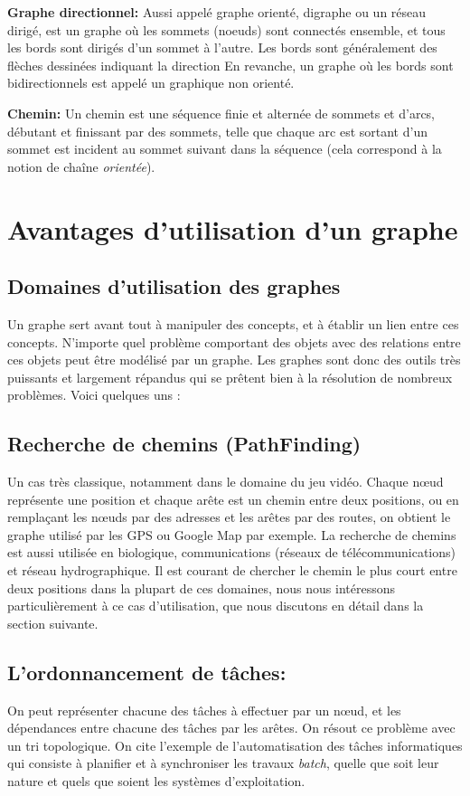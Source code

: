 	\textbf{Graphe directionnel:} Aussi appelé graphe orienté, digraphe ou un réseau dirigé, est un graphe où les sommets (noeuds) sont connectés ensemble, et tous les bords sont dirigés d'un sommet à l'autre. Les bords sont généralement des flèches dessinées indiquant la direction En revanche, un graphe où les bords sont bidirectionnels est appelé un graphique non orienté.

	\textbf{Chemin:} Un chemin est une séquence finie et alternée de sommets et d'arcs, débutant et finissant par des sommets, telle que chaque arc est sortant d'un sommet est incident au sommet suivant dans la séquence (cela correspond à la notion de chaîne \emph{orientée}).

	
	
	\section{Avantages d'utilisation d'un graphe}
	\subsection{Domaines d'utilisation des graphes}
	Un graphe sert avant tout à manipuler des concepts, et à établir un lien entre ces concepts. N'importe quel problème comportant des objets avec des relations entre ces objets peut être modélisé par un graphe.
Les graphes sont donc des outils très puissants et largement répandus qui se prêtent bien à la résolution de nombreux problèmes. Voici quelques uns :

	\subsection{Recherche de chemins (PathFinding)}
	Un cas très classique, notamment dans le domaine du jeu vidéo. Chaque nœud représente une position et chaque arête est un chemin entre deux positions, ou en remplaçant les nœuds par des adresses et les arêtes par des routes, on obtient le graphe utilisé par les GPS ou Google Map par exemple.
La recherche de chemins est aussi utilisée en biologique, communications (réseaux de télécommunications) et réseau hydrographique.
Il est courant de chercher le chemin le plus court entre deux positions dans la plupart de ces domaines, nous nous intéressons particulièrement à ce cas d'utilisation, que nous discutons en détail dans la section suivante.


	\subsection{L'ordonnancement de tâches:}
	On peut représenter chacune des tâches à effectuer par un nœud, et les dépendances entre chacune des tâches par les arêtes. On résout ce problème avec un tri topologique.
On cite l'exemple de l'automatisation des tâches informatiques qui consiste à planifier et à synchroniser les travaux \emph{batch}, quelle que soit leur nature et quels que soient les systèmes d'exploitation.

